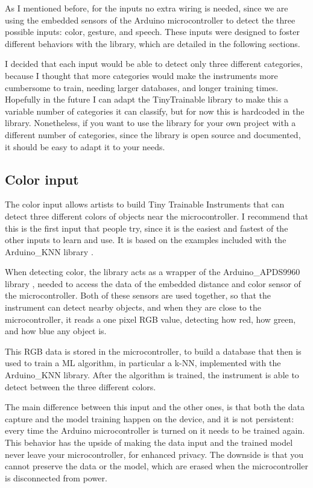As I mentioned before, for the inputs no extra wiring is needed, since we are using the embedded sensors of the Arduino microcontroller to detect the three possible inputs: color, gesture, and speech. These inputs were designed to foster different behaviors with the library, which are detailed in the following sections.

I decided that each input would be able to detect only three different categories, because I thought that more categories would make the instruments more cumbersome to train, needing larger databases, and longer training times. Hopefully in the future I can adapt the TinyTrainable library to make this a variable number of categories it can classify, but for now this is hardcoded in the library. Nonetheless, if you want to use the library for your own project with a different number of categories, since the library is open source and documented, it should be easy to adapt it to your needs.

\subsection{Color input}

The color input allows artists to build Tiny Trainable Instruments that can detect three different colors of objects near the microcontroller. I recommend that this is the first input that people try, since it is the easiest and fastest of the other inputs to learn and use. It is based on the examples included with the Arduino{\_}KNN library \cite{repository-arduino-knn}.

When detecting color, the library acts as a wrapper of the Arduino{\_}APDS9960 library \cite{repository-arduino-APDS9960}, needed to access the data of the embedded distance and color sensor of the microcontroller. Both of these sensors are used together, so that the instrument can detect nearby objects, and when they are close to the microcontroller, it reads a one pixel \acrshort{RGB} value, detecting how red, how green, and how blue any object is.

This \acrshort{RGB} data is stored in the microcontroller, to build a database that then is used to train a \acrshort{ML} algorithm, in particular a \acrfull{k-NN}, implemented with the Arduino{\_}KNN library. After the algorithm is trained, the instrument is able to detect between the three different colors.

The main difference between this input and the other ones, is that both the data capture and the model training happen on the device, and it is not persistent: every time the Arduino microcontroller is turned on it needs to be trained again. This behavior has the upside of making the data input and the trained model never leave your microcontroller, for enhanced privacy. The downside is that you cannot preserve the data or the model, which are erased when the microcontroller is disconnected from power.

